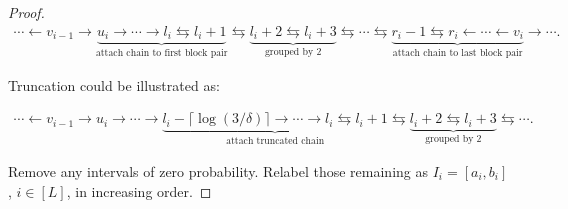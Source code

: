 \documentclass[11pt]{article}
\theoremstyle{statplain}
\theoremstyle{statdefinition}
\newcommand{\ra}{\rightarrow}
\newcommand{\la}{\leftarrow}
\newcommand{\0}{\mathbf{0}}
\newcommand{\cI}{\mathcal{I}}
\begin{document}
\begin{proof}
\begin{align}\label{eq:endpoint_illustration}
  \cdots \la v_{i-1} \ra \underbrace{\boxed{ u_i\ra\cdots\ra l_i\leftrightarrows l_i + 1 } }_{\text{attach chain to first block pair}}\leftrightarrows \underbrace{\boxed{ l_i + 2 \leftrightarrows l_i + 3} }_{\text{grouped by 2}} \leftrightarrows   \cdots 
 \leftrightarrows \underbrace{\boxed{ r_i - 1 \leftrightarrows  r_i\la\cdots\la v_i}}_{\text{attach chain to last block pair}}  \ra \cdots .
\end{align}

Truncation could be illustrated as:

\begin{align}\label{eq:truncation_illustration}
 \cdots \la v_{i-1} \ra  u_i\ra\cdots\ra \underbrace{\boxed{l_i - \lceil \log(3/\delta)\rceil\ra \cdots\ra l_i\leftrightarrows l_i + 1 } }_{\text{attach truncated chain}}\leftrightarrows \underbrace{\boxed{ l_i + 2 \leftrightarrows l_i + 3} }_{\text{grouped by 2}} \leftrightarrows   \cdots 
 .
\end{align}




 
Remove any intervals of zero probability. Relabel those remaining as
$I_i=[a_i,b_i]$, $i\in[L]$, in increasing order. 











\end{proof}
\end{document}
